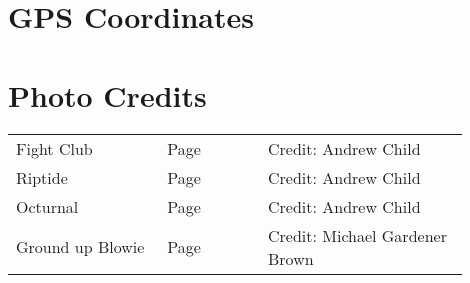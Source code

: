 \begin{flushleft}
\section{GPS Coordinates}
\section{Photo Credits}
\begin{supertabular}{p{0.3\linewidth}p{0.2\linewidth}p{0.4\linewidth}}
Fight Club&Page \pageref{pt:Fight Club}&Credit: Andrew Child\\
Riptide&Page \pageref{pt:Riptide}&Credit: Andrew Child\\
Octurnal&Page \pageref{pt:Octurnal}&Credit: Andrew Child\\
Ground up Blowie&Page \pageref{pt:Ground up Blowie}&Credit: Michael Gardener Brown\\
\end{supertabular}
\end{flushleft}
\onecolumn
\clearpage